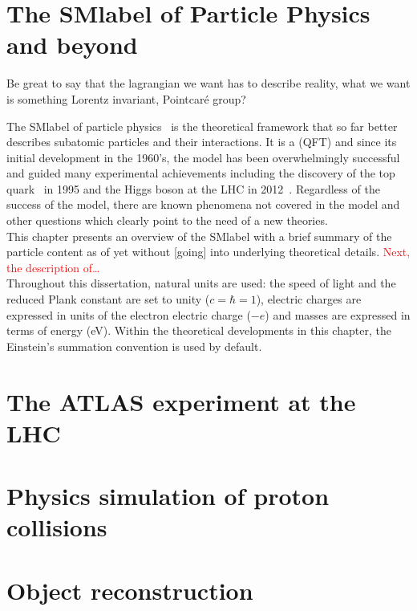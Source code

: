 \chapter{The \acrlong{SMlabel} of Particle Physics and beyond}

Be great to say that the lagrangian we want has to describe reality, what we want is something Lorentz invariant, Pointcaré group?

The \acrfull{SMlabel} of particle physics~\cite{PhysRevLett.19.1264,GLASHOW1961579,RevModPhys.52.525} is the theoretical framework
that so far better describes subatomic particles and their interactions.
It is a  (\acrshort{QFT}) and since its initial development in the 1960's,
the model has been overwhelmingly successful and guided many experimental achievements
including the discovery of the top quark~\cite{topsearch1995,PhysRevLett.74.2626} in 1995
and the Higgs boson at the LHC in 2012~\cite{ATLASHiggs2012,CMShiggs2012}.
Regardless of the success of the model, there are known phenomena not covered in the model
and other questions which clearly point to the need of a new theories.\\
This chapter presents an overview of the \acrshort{SMlabel} with a brief summary of the particle content as of yet without
[going] into underlying theoretical details. \textcolor{red}{Next, the description of\ldots}\\

Throughout this dissertation, natural units are used: the speed of light and the reduced Plank constant are set to unity ($c=\hbar=1$),
electric charges are expressed in units of the electron electric charge ($-e$) and masses are expressed in terms of energy (eV).
Within the theoretical developments in this chapter, the Einstein's summation convention is used by default. 



\chapter{The ATLAS experiment at the LHC}



\chapter{Physics simulation of proton collisions}



\chapter{Object reconstruction}


